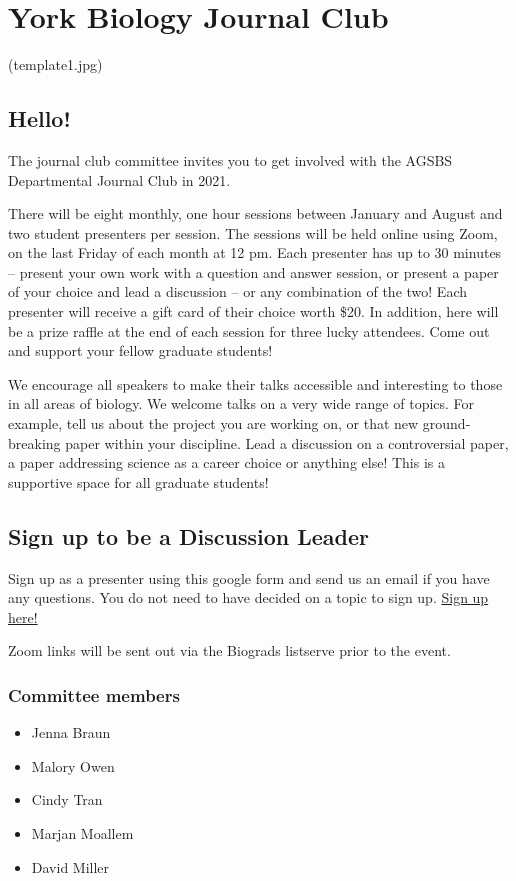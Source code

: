 \documentclass[
]{article}
\author{}
\date{\vspace{-2.5em}}
\providecommand{\tightlist}{%
  \setlength{\itemsep}{0pt}\setlength{\parskip}{0pt}}
\begin{document}
\hypertarget{york-biology-journal-club}{%
\section{York Biology Journal Club}\label{york-biology-journal-club}}

(template1.jpg)

\hypertarget{hello}{%
\subsection{Hello!}\label{hello}}

The journal club committee invites you to get involved with the AGSBS
Departmental Journal Club in 2021.

There will be eight monthly, one hour sessions between January and
August and two student presenters per session. The sessions will be held
online using Zoom, on the last Friday of each month at 12 pm. Each
presenter has up to 30 minutes -- present your own work with a question
and answer session, or present a paper of your choice and lead a
discussion -- or any combination of the two! Each presenter will receive
a gift card of their choice worth \$20. In addition, here will be a
prize raffle at the end of each session for three lucky attendees. Come
out and support your fellow graduate students!

We encourage all speakers to make their talks accessible and interesting
to those in all areas of biology. We welcome talks on a very wide range
of topics. For example, tell us about the project you are working on, or
that new ground-breaking paper within your discipline. Lead a discussion
on a controversial paper, a paper addressing science as a career choice
or anything else! This is a supportive space for all graduate students!

\hypertarget{sign-up-to-be-a-discussion-leader}{%
\subsection{Sign up to be a Discussion
Leader}\label{sign-up-to-be-a-discussion-leader}}

Sign up as a presenter using this google form and send us an email if
you have any questions. You do not need to have decided on a topic to
sign up.
\href{https://docs.google.com/forms/d/e/1FAIpQLSdAdlvA4kEKg68sLV6CCKkBobYLIipfGbs_FrUJab_jkkqqiQ/viewform?usp=sf_link}{Sign
up here!}

Zoom links will be sent out via the Biograds listserve prior to the
event.

\hypertarget{committee-members}{%
\subsubsection{Committee members}\label{committee-members}}

\begin{itemize}
\tightlist
\item
  Jenna Braun
\item
  Malory Owen
\item
  Cindy Tran
\item
  Marjan Moallem
\item
  David Miller
\end{itemize}
\end{document}
